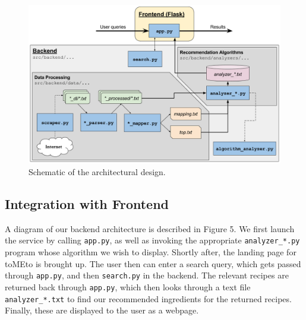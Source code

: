 \documentclass{acm_proc_article-sp}
\begin{document}
\begin{figure}[t]
	\centering
	\includegraphics[width=\textwidth]{architecture}
	\caption{Schematic of the architectural design.}
	\label{fig:}
\end{figure}

\subsection{Integration with Frontend}
A diagram of our backend architecture is described in Figure 5. We first launch the service by calling \texttt{app.py}, as well as invoking the appropriate \texttt{analyzer\_*.py} program whose algorithm we wish to display. Shortly after, the landing page for toMEto is brought up. The user then can enter a search query,
which gets passed through \texttt{app.py}, and then \texttt{search.py} in the backend. The relevant
recipes are returned back through \texttt{app.py}, which then looks through a text file \texttt{analyzer\_*.txt} to find our recommended ingredients for the returned recipes. Finally, these are displayed to the user 
 as a webpage.
\end{document}

